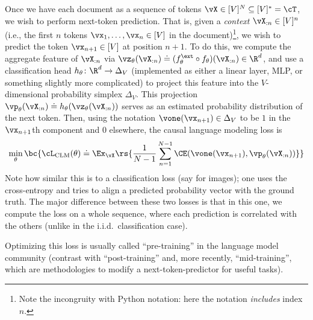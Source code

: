 \documentclass[../../book-main.tex]{subfiles}
\begin{document}
Once we have each document as a sequence of tokens \(\vX \in [V]^{N} \subseteq [V]^{*} = \cT\), we wish to perform next-token prediction. That is, given a \textit{context} \(\vX_{:n} \in [V]^{n}\) (i.e., the first \(n\) tokens \(\vx_{1}, \dots, \vx_{n} \in [V]\) in the document)\footnote{Note the incongruity with Python notation: here the notation \textit{includes} index \(n\).}, we wish to predict the token \(\vx_{n + 1} \in [V]\) at position \(n + 1\). To do this, we compute the aggregate feature of \(\vX_{:n}\) via \(\vz_{\theta}(\vX_{:n}) \doteq (f_{\theta}^{\ext} \circ f_{\theta})(\vX_{:n}) \in \R^{d}\), and use a classification head \(h_{\theta} \colon \R^{d} \to \Delta_{V}\) (implemented as either a linear layer, MLP, or something slightly more complicated) to project this feature into the \(V\)-dimensional probability simplex \(\Delta_{V}\). This projection \(\vp_{\theta}(\vX_{:n}) \doteq h_{\theta}(\vz_{\theta}(\vX_{:n}))\) serves as an estimated probability distribution of the next token. Then, using the notation \(\vone(\vx_{n + 1}) \in \Delta_{V}\) to be \(1\) in the \(\vx_{n + 1}\)th component and \(0\) elsewhere, the causal language modeling loss is
\begin{equation}\label{eq:clm_loss}
    \min_{\theta}\bc{\cL_{\mathrm{CLM}}(\theta) \doteq \Ex_{\vX}\rs{\frac{1}{N - 1}\sum_{n = 1}^{N - 1}\CE(\vone(\vx_{n + 1}), \vp_{\theta}(\vX_{:n}))}}
\end{equation}
Note how similar this is to a classification loss (say for images); one uses the cross-entropy and tries to align a predicted probability vector with the ground truth. The major difference between these two losses is that in this one, we compute the loss on a whole sequence, where each prediction is correlated with the others (unlike in the i.i.d.~classification case). 

Optimizing this loss is usually called ``pre-training'' in the language model community (contrast with ``post-training'' and, more recently, ``mid-training'', which are methodologies to modify a next-token-predictor for useful tasks).
\end{document}
